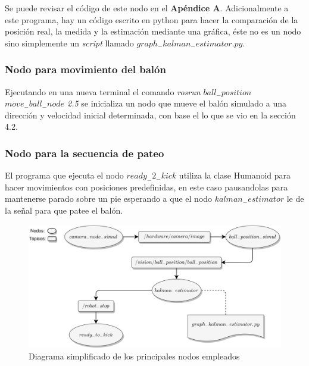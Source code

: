 			Se puede revisar el código de este nodo en el \textbf{Apéndice A}.
	Adicionalmente a este programa, hay un código escrito en python para hacer la comparación de la posición real, la medida y la estimación mediante una gráfica, éste no es un nodo sino simplemente un \textit{script} llamado $graph_-kalman_-estimator.py$.
			
			\subsubsection*{Nodo para movimiento del balón}
			Ejecutando en una nueva terminal el comando \textit{rosrun $ball_-position$ $move_-ball_-node$ 2.5} se inicializa un nodo que mueve el balón simulado a una dirección y velocidad inicial determinada, con base el lo que se vio en la sección 4.2. 
			
			\subsubsection*{Nodo para la secuencia de pateo} 
			El programa que ejecuta el nodo \textit{$ready_-2_-kick$} utiliza la clase Humanoid para hacer movimientos con posiciones predefinidas, en este caso pausandolas para mantenerse parado sobre un pie esperando a que el nodo $kalman_-estimator$ le de la señal para que patee el balón.
		
		
\begin{figure}
	\centering
	\includegraphics[scale=0.071]{images/nodes_diagram.png}
	\caption{Diagrama simplificado de los principales nodos empleados}
	\label{fig:nodes_diagram}
\end{figure}
		
